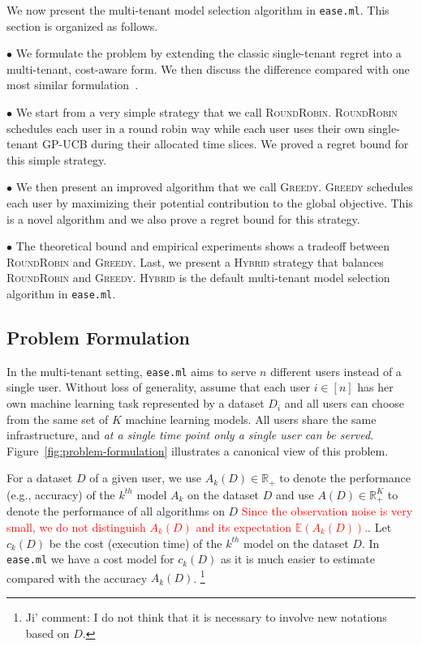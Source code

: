\documentclass[letterpaper]{vldb}
\newcommand{\eml}{\texttt{ease.ml}\xspace}
\newcommand{\rr}{\textsc{RoundRobin}\xspace}
\newcommand{\hybrid}{\textsc{Hybrid}\xspace}
\newcommand{\greedy}{\textsc{Greedy}\xspace}
\def\R{\mathbb{R}}
\begin{document}
We now present the multi-tenant model selection
algorithm in \eml. This section is organized as follows.

\noindent
$\bullet$ We formulate the problem 
by extending the classic single-tenant regret
into a multi-tenant, cost-aware form. We then 
discuss the difference compared with
one most similar formulation~\cite{XXX}.

\noindent
$\bullet$
We start from a very simple strategy that we call
\rr. \rr schedules
each user in a round robin way while each user
uses their own single-tenant GP-UCB
during their allocated time slices. We proved 
a regret bound for this simple strategy.

\noindent
$\bullet$
We then present an improved algorithm that we
call \greedy. \greedy schedules
each user by maximizing their potential contribution
to the global objective. This is a novel algorithm
and we also prove a regret bound for this strategy.

\noindent
$\bullet$
The theoretical bound and empirical experiments
shows a tradeoff between \rr and
\greedy. Last, we present a \hybrid 
strategy that balances 
\rr and \greedy. \hybrid is the 
default multi-tenant model selection algorithm
in \eml.


\subsection{Problem Formulation}

In the multi-tenant setting, \eml aims
to serve $n$ different users instead of a single user.
Without loss of generality, assume that
each user $i\in[n]$ has her own machine learning 
task represented by a dataset $D_i$
and all users can choose from the
same set of $K$ machine learning models.
All users share the same infrastructure,
and {\em at a single time point only
a single user can be served}.
Figure~\ref{fig:problem-formulation} illustrates 
a canonical view of this problem.


For a dataset $D$ of a given user, 
we use $A_k(D) \in \R_+$ to denote the performance (e.g.,  accuracy) of the $k^{th}$ model 
$A_k$ on the dataset $D$ and use
$A(D) \in \R_+^K$ to denote the performance of all algorithms on $D$ \textcolor{red}{Since the observation noise is very small, we do not distinguish $A_k(D)$ and its expectation $\mathbb{E}(A_k(D))$.}. Let $c_k(D)$ be the cost (execution time)
of the $k^{th}$ model on the dataset $D$.
In \eml we have a cost model for $c_k(D)$
as it is much easier to estimate compared with
the accuracy $A_k(D)$. 
\footnote{Ji' comment: I do not think that it is necessary to involve new notations based on $D$.}
\end{document}
